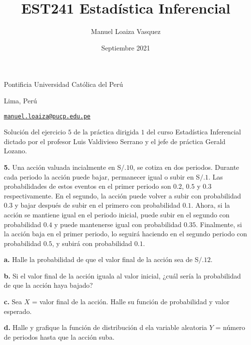 \documentclass{article}
\title{EST241 Estad\'istica Inferencial}
\author{Manuel Loaiza Vasquez}
\date{Septiembre 2021}
\newenvironment{statement}[1]{\smallskip\noindent\color[rgb]{1.00,0.00,0.50} {\bf #1.}}{}
\theoremstyle{definition}
\theoremstyle{remark}
\begin{document}
\maketitle

\vspace*{-0.25in}
\centerline{Pontificia Universidad Cat\'olica del Per\'u}
\centerline{Lima, Per\'u}
\centerline{\href{mailto:manuel.loaiza@pucp.edu.pe}{{\tt manuel.loaiza@pucp.edu.pe}}}
\vspace*{0.15in}

\begin{framed}
  Soluci\'on del ejercicio $5$ de la pr\'actica dirigida $1$ del curso
  Estad\'istica Inferencial dictado por el profesor Luis Valdivieso Serrano
  y el jefe de pr\'actica Gerald Lozano.
\end{framed}

\begin{statement}{5}
  Una acci\'on valuada incialmente en S$/. 10$, se cotiza en dos periodos.
  Durante cada periodo la acci\'on puede bajar, permanecer igual o subir en S$/. 1$.
  Las probabilidades de estos eventos en el primer periodo son $0.2$, $0.5$ y $0.3$ respectivamente.
  En el segundo, la acci\'on puede volver a subir con probabilidad $0.3$ y bajar
  despu\'es de subir en el primero con probabilidad $0.1$.
  Ahora, si la acci\'on se mantiene igual en el periodo inicial, puede subir en
  el segundo con probabilidad $0.4$ y puede mantenerse igual con probabilidad
  $0.35$. Finalmente, si la acci\'on baja en el primer periodo, lo seguir\'a
  haciendo en el segundo periodo con probabilidad $0.5$, y subir\'a con
  probabilidad $0.1$.
\end{statement}

\begin{statement}{a}
  Halle la probabilidad de que el valor final de la acci\'on sea de S$/. 12$.
\end{statement}

\begin{statement}{b}
  Si el valor final de la acci\'on iguala al valor inicial, ¿cu\'al ser\'ia
  la probabilidad de que la acci\'on haya bajado?
\end{statement}

\begin{statement}{c}
  Sea $X$ = valor final de la acci\'on. Halle su funci\'on de probabilidad
  y valor esperado.
\end{statement}

\begin{statement}{d}
  Halle y grafique la funci\'on de distribuci\'on d ela variable aleatoria
  $Y$ = n\'umero de periodos hasta que la acci\'on suba.
\end{statement}
\end{document}
